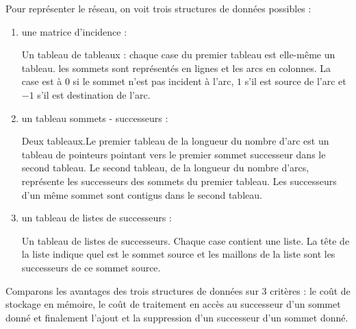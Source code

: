 \documentclass[11pt, a4paper]{report}
\begin{document}
	Pour représenter le réseau, on voit trois structures de données possibles :
	\begin{enumerate}
		\item une matrice d'incidence :
		
		Un tableau de tableaux : chaque case du premier tableau est elle-même un tableau. les sommets sont représentés en lignes et les arcs en colonnes. La case est à $0$ si le sommet n'est pas incident à l'arc, $1$ s'il est source de l'arc et $-1$ s'il est destination de l'arc.\\
		
		\item un tableau sommets - successeurs :
		
		Deux tableaux.Le premier tableau de la longueur du nombre d'arc est un tableau de pointeurs pointant vers le premier sommet successeur dans le second tableau. Le second tableau, de la longueur du nombre d'arcs, représente les successeurs des sommets du premier tableau. Les successeurs d'un même sommet sont contigus dans le second tableau.\\
		
		\item un tableau de listes de successeurs :
		
		Un tableau de listes de successeurs. Chaque case contient une liste. La tête de la liste indique quel est le sommet source et les maillons de la liste sont les successeurs de ce sommet source.\\
		
	\end{enumerate}
	
    Comparons les avantages des trois structures de données sur 3 critères : le coût de stockage en mémoire, le coût de traitement en accès au successeur d'un sommet donné et finalement l'ajout et la suppression d'un successeur d'un sommet donné.
    
\end{document}
